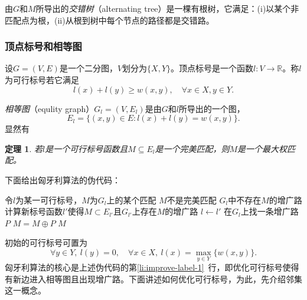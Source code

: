 \documentclass[a4paper]{ctexbook}
\newtheorem{theorem}{定理}[chapter] %
\begin{document}
  由$G$和$M$所导出的\emph{交错树}（alternating tree）是一棵有根树，它满足：(i)以某个非匹配点为根，(ii)从根到树中每个节点的路径都是交错路。
  \subsubsection{顶点标号和相等图}
  设$G=(V,E)$是一个二分图，$V$划分为$\{X,Y\}$。顶点标号是一个函数$l\colon V\to\mathbb{R}$。称$l$为可行标号若它满足
  \[
    l(x)+l(y)\ge w(x,y),\quad \forall x\in X, y\in Y.
  \]

  \emph{相等图}（equlity graph）$G_l=(V,E_l)$是由$G$和$l$所导出的一个图，
  \[
    E_l = \{(x,y)\in E\colon l(x)+l(y)=w(x,y)\}.
  \]
  显然有
  \begin{theorem}
    若$l$是一个可行标号函数且$M\subseteq E_l$是一个完美匹配，则$M$是一个最大权匹配。
  \end{theorem}
  下面给出匈牙利算法的伪代码：
  \begin{codebox}
    \li 令$l$为某一可行标号，$M$为$G_l$上的某个匹配
    \li \While $M$不是完美匹配
    \li \Do \label{li:begin-augment}
          \If $G_l$中不存在$M$的增广路
    \li     \Then
              计算新标号函数$l'$使得$M\subset E_{l'}$且$G_{l'}$上存在$M$的增广路 \label{li:improve-label-1}
    \li       $l \gets l'$
          \End
    \li   在$G_l$上找一条增广路$P$
    \li   $M=M\oplus P$
        \End  \label{li:end-augment}
    \li    \Return $M$
  \end{codebox}
  初始的可行标号可置为
  \[\forall y\in Y,\ l(y)=0,\quad \forall x\in X,\  l(x)=\max_{y\in Y}\{w(x,y)\}.\]
  匈牙利算法的核心是上述伪代码的第\ref{li:improve-label-1}~行，即优化可行标号使得有新边进入相等图且出现增广路。下面讲述如何优化可行标号，为此，先介绍邻集这一概念。
\end{document}
